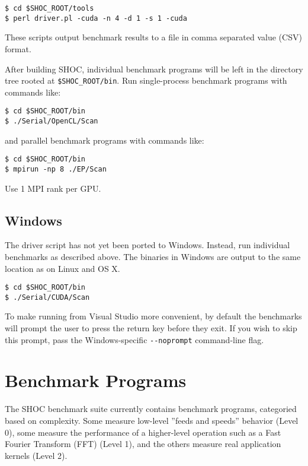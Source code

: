 \documentclass[11pt]{article}
\begin{document}
\begin{Verbatim}[frame=single]
$ cd $SHOC_ROOT/tools
$ perl driver.pl -cuda -n 4 -d 1 -s 1 -cuda
\end{Verbatim}

These scripts output benchmark results to a file in comma separated value (CSV) format.

After building SHOC, individual benchmark programs will be left in the
directory tree rooted at \verb+$SHOC_ROOT/bin+.
Run single-process benchmark programs with commands like:

\begin{Verbatim}[frame=single]
$ cd $SHOC_ROOT/bin
$ ./Serial/OpenCL/Scan 
\end{Verbatim}

and parallel benchmark programs with commands like:

\begin{Verbatim}[frame=single]
$ cd $SHOC_ROOT/bin
$ mpirun -np 8 ./EP/Scan
\end{Verbatim}

Use 1 MPI rank per GPU.  

\subsection{Windows}

The driver script has not yet been ported to Windows.
Instead, run individual benchmarks as described above.
The binaries in Windows are output to the same location
as on Linux and OS X.

\begin{Verbatim}[frame=single]
$ cd $SHOC_ROOT/bin
$ ./Serial/CUDA/Scan 
\end{Verbatim}

To make running from Visual Studio more convenient,
by default the benchmarks will prompt the user
to press the return key before they exit.
If you wish to skip this prompt, pass the
Windows-specific \verb+--noprompt+ command-line flag.

\section{Benchmark Programs}\label{sec:programs}

The SHOC benchmark suite currently contains benchmark programs, categoried
based on complexity.  Some measure low-level ''feeds and speeds'' behavior
(Level 0), some measure the performance of a higher-level operation such 
as a Fast Fourier Transform (FFT) (Level 1), and the others measure 
real application kernels (Level 2).
\end{document}
